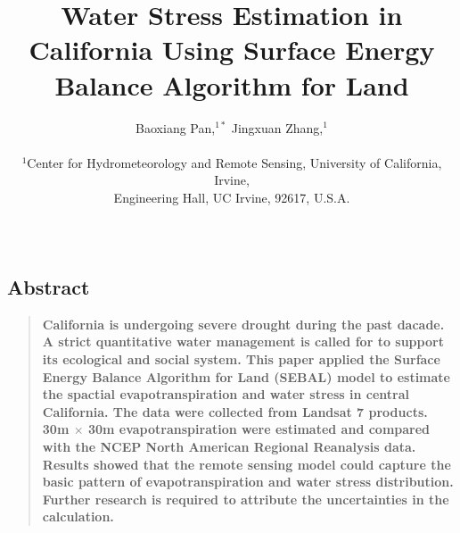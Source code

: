 \documentclass[12pt]{article}
\title{Water Stress Estimation in California Using Surface Energy Balance Algorithm for Land}
\author
{Baoxiang Pan,$^{1\ast}$ Jingxuan Zhang,$^{1}$\\
\\
\normalsize{$^{1}$Center for Hydrometeorology and Remote Sensing, University of California, Irvine,}\\
\normalsize{Engineering Hall, UC Irvine, 92617, U.S.A.}\\
\\
}
\date{}
\newenvironment{sciabstract}{%
\begin{quote} \bf}
{\end{quote}}
\begin{document}
 


\baselineskip24pt


\maketitle 



\begin{center}
\section*{Abstract}
\end{center}
\begin{sciabstract}
California is undergoing severe drought during the past dacade. A strict quantitative water management is called for to support its ecological and social system. This paper applied the Surface Energy Balance Algorithm for Land (SEBAL) model to estimate the spactial evapotranspiration and water stress in central California. The data were collected from Landsat 7 products. 30m $\times$ 30m evapotranspiration were estimated and compared with the NCEP North American Regional Reanalysis data. Results showed that the remote sensing model could capture the basic pattern of evapotranspiration and water stress distribution. Further research is required to attribute the uncertainties in the calculation. 
\end{sciabstract}



\end{document}
